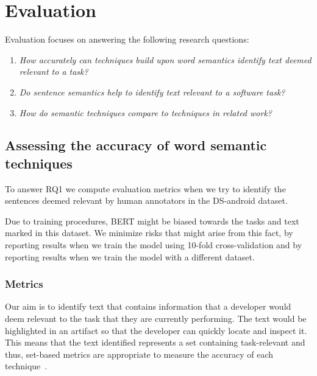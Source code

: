 \section{Evaluation}
\label{cp5:evaluation}


Evaluation focuses 
on answering the following research questions:


\begin{enumerate}[label=\textit{RQ\arabic*}]

    \item \textit{How accurately can techniques build upon word semantics identify text deemed relevant to a task?}
    
    \item \textit{Do sentence semantics help to identify text relevant to a software task?}

    \item \textit{How do semantic techniques compare to techniques in related work?}
\end{enumerate}
    





\subsection{Assessing the accuracy of word semantic techniques}


To answer RQ1 we compute evaluation metrics when we try to identify the sentences deemed relevant by human annotators in the \acs{DS-android} dataset.


Due to training procedures, BERT might be biased towards the tasks and text marked in this dataset. We minimize risks that might arise from this fact, by reporting results when we train the model using 10-fold cross-validation and by reporting results when we 
train the model with a different dataset.


\subsubsection{Metrics}


Our aim is to identify text that contains information that a developer would deem relevant to the task that they are currently performing. 
The text would be highlighted in an artifact so that the developer can quickly locate and inspect it. 
This means that the text identified represents a set containing task-relevant and thus, 
set-based metrics are appropriate to measure the accuracy of each technique~\cite{Manning2009IR}.


